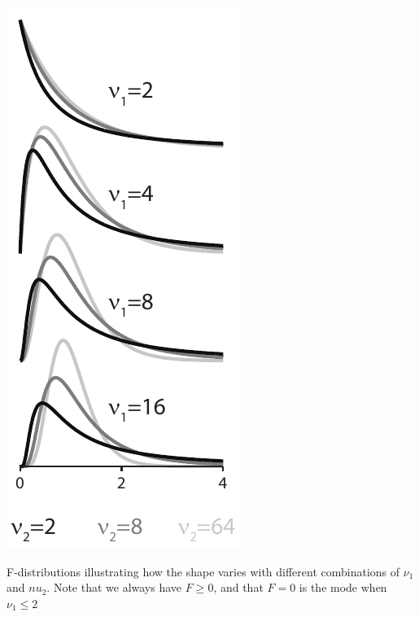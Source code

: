 \documentclass{tufte-handout}
\begin{document}
\begin{marginfigure}[10pt]
  \includegraphics[width=\linewidth]{images/handout4_fpdf}%
  \label{fig:fullfig}%
  \caption{F-distributions illustrating how the shape varies with different combinations of $\nu_1$ and $nu_2$. Note that we always have $F \geq 0$, and that $F=0$ is the mode when $\nu_1\leq 2$}
\end{marginfigure}
\end{document}
